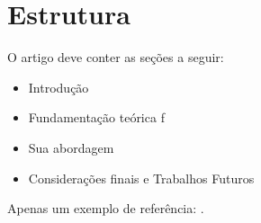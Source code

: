 \section{Estrutura}
\label{sec:intro}

O artigo deve conter as seções a seguir:

\begin{itemize}
    \item Introdução
    \item Fundamentação teórica f
    \item Sua abordagem
    \item Considerações finais e Trabalhos Futuros
\end{itemize}

Apenas um exemplo de referência: \cite{aurelio}.